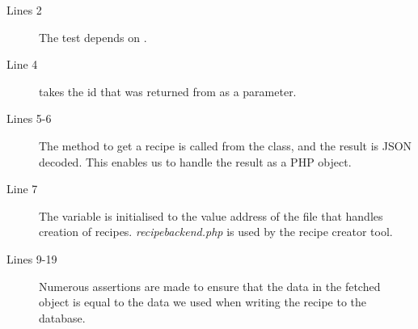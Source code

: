 \begin{description}
\item[Lines 2] The test depends on .
\item[Line 4]  takes the id that was returned from  as a parameter.
\item[Lines 5-6] The method to get a recipe is called from the  class, and the result is JSON decoded. This enables us to handle the result as a PHP object.
\item[Line 7] The  variable is initialised to the value address of the file that handles creation of recipes. \textit{recipebackend.php} is used by the recipe creator tool.%
\item[Lines 9-19] Numerous assertions are made to ensure that the data in the fetched object is equal to the data we used when writing the recipe to the database.
\end{description}



